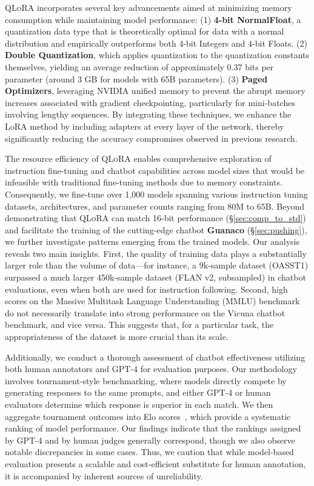 \textsc{QLoRA} incorporates several key advancements aimed at minimizing memory consumption while maintaining model performance: (1) \textbf{4-bit NormalFloat}, a quantization data type that is theoretically optimal for data with a normal distribution and empirically outperforms both 4-bit Integers and 4-bit Floats. (2) \textbf{Double Quantization}, which applies quantization to the quantization constants themselves, yielding an average reduction of approximately 0.37 bits per parameter (around 3 GB for models with 65B parameters). (3) \textbf{Paged Optimizers}, leveraging NVIDIA unified memory to prevent the abrupt memory increases associated with gradient checkpointing, particularly for mini-batches involving lengthy sequences. By integrating these techniques, we enhance the LoRA method by including adapters at every layer of the network, thereby significantly reducing the accuracy compromises observed in previous research.

The resource efficiency of \textsc{QLoRA} enables comprehensive exploration of instruction fine-tuning and chatbot capabilities across model sizes that would be infeasible with traditional fine-tuning methods due to memory constraints. Consequently, we fine-tune over 1,000 models spanning various instruction tuning datasets, architectures, and parameter counts ranging from 80M to 65B. Beyond demonstrating that \textsc{QLoRA} can match 16-bit performance (\S\ref{sec:comp_to_std}) and facilitate the training of the cutting-edge chatbot \textbf{Guanaco} (\S\ref{sec:pushing}), we further investigate patterns emerging from the trained models. Our analysis reveals two main insights. First, the quality of training data plays a substantially larger role than the volume of data—for instance, a 9k-sample dataset (OASST1) surpassed a much larger 450k-sample dataset (FLAN v2, subsampled) in chatbot evaluations, even when both are used for instruction following. Second, high scores on the Massive Multitask Language Understanding (MMLU) benchmark do not necessarily translate into strong performance on the Vicuna chatbot benchmark, and vice versa. This suggests that, for a particular task, the appropriateness of the dataset is more crucial than its scale.

Additionally, we conduct a thorough assessment of chatbot effectiveness utilizing both human annotators and GPT-4 for evaluation purposes. Our methodology involves tournament-style benchmarking, where models directly compete by generating responses to the same prompts, and either GPT-4 or human evaluators determine which response is superior in each match. We then aggregate tournament outcomes into Elo scores~\citep{elo1967proposed, elo1978rating}, which provide a systematic ranking of model performance. Our findings indicate that the rankings assigned by GPT-4 and by human judges generally correspond, though we also observe notable discrepancies in some cases. Thus, we caution that while model-based evaluation presents a scalable and cost-efficient substitute for human annotation, it is accompanied by inherent sources of unreliability.

